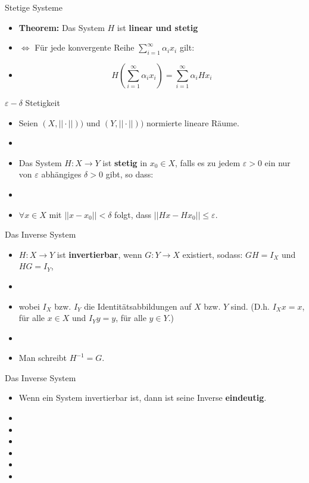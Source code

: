 \documentclass[14pt, aspectratio=169, handout]{beamer}
\begin{document}
\begin{frame}{Stetige Systeme}
    \begin{itemize}
        \item \textbf{Theorem:} Das System $H$ ist \textbf{linear und stetig}
        \item[] \hspace{64pt}  $\Leftrightarrow$ Für jede konvergente Reihe $\sum_{i=1}^\infty \alpha_i x_i$ gilt:
        \item[] 
    $$H\left( \sum_{i=1}^\infty \alpha_i x_i \right) = \sum_{i=1}^\infty \alpha_i H x_i$$
    \end{itemize}
\end{frame}

\begin{frame}{$\varepsilon-\delta$ Stetigkeit}
    \begin{itemize}
        \item Seien $(X, ||\cdot||))$ und $(Y, ||\cdot||))$ normierte lineare Räume.
        \item[] 
        \item[] Das System $H:X \to Y$ ist \textbf{stetig} in $x_0 \in X$, falls es zu jedem $\varepsilon > 0$ ein nur von $\varepsilon$ abhängiges $\delta >0$ gibt, so dass:
        \item[] 
        \item[] $\forall x\in X$ mit $||x-x_0||<\delta$ folgt, dass $||Hx-Hx_0||\leq \varepsilon$.
    \end{itemize}
\end{frame}

\begin{frame}{Das Inverse System}
    \begin{itemize}
        \item $H:X \to Y$ ist \textbf{invertierbar}, wenn $G:Y \to X$ existiert, sodass: $GH = I_X$ und $HG = I_Y$, 
        \item[] 
        \item[] wobei $I_X$ bzw. $I_Y$ die Identitätsabbildungen auf $X$ bzw. $Y$ sind. (D.h. $I_X x = x$, für alle $x\in X$ und $I_Y y= y$, für alle $y \in Y$.) 
        \item[] 
        \item Man schreibt $H^{-1} = G$.
    \end{itemize}
\end{frame}

\begin{frame}{Das Inverse System}
    \begin{itemize}
        \item Wenn ein System invertierbar ist, dann ist seine Inverse \textbf{eindeutig}.
        \item[] 
        \item[]
        \item[] 
        \item[]
        \item[] 
        \item[]
    \end{itemize}
\end{frame}
\end{document}
